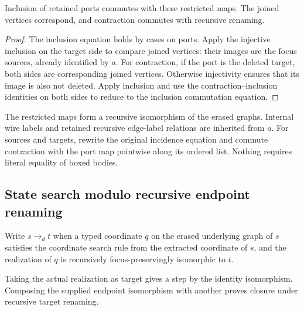 \begin{lemma}
Inclusion of retained ports commutes with these restricted maps. The joined
vertices correspond, and contraction commutes with recursive renaming.
\end{lemma}
\begin{proof}
The inclusion equation holds by cases on ports. Apply the injective inclusion
on the target side to compare joined vertices: their images are the focus
sources, already identified by $a$. For contraction, if the port is the
deleted target, both sides are corresponding joined vertices. Otherwise
injectivity ensures that its image is also not deleted. Apply inclusion and
use the contraction--inclusion identities on both sides to reduce to the
inclusion commutation equation.
\end{proof}

The restricted maps form a recursive isomorphism of the erased graphs.
Internal wire labels and retained recursive edge-label relations are inherited
from $a$. For sources and targets, rewrite the original incidence equation
and commute contraction with the port map pointwise along its ordered list.
Nothing requires literal equality of boxed bodies.

\subsection{State search modulo recursive endpoint renaming}
\begin{definition}
Write $s\longrightarrow_d t$ when a typed coordinate $q$ on the erased
underlying graph of $s$ satisfies the coordinate search rule from the extracted
coordinate of $s$, and the realization of $q$ is recursively
focus-preservingly isomorphic to $t$.
\end{definition}
Taking the actual realization as target gives a step by the identity
isomorphism. Composing the supplied endpoint isomorphism with another proves
closure under recursive target renaming.

